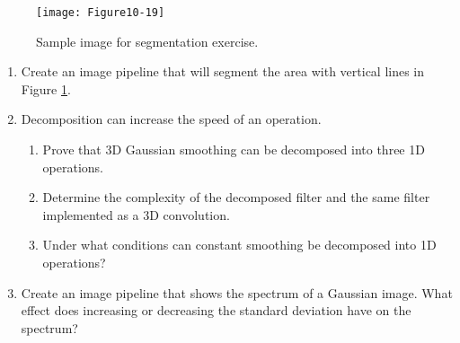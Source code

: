 \begin{figure}[!htb]
	\centering
	\texttt{[image: Figure10-19]}
	\caption{Sample image for segmentation exercise.}
	\label{fig:Figure10-19}
\end{figure}

\begin{enumerate}

\item Create an image pipeline that will segment the area with vertical lines in Figure \ref{fig:Figure10-19}.

\item Decomposition can increase the speed of an operation.

    \begin{enumerate}

    \item Prove that 3D Gaussian smoothing can be decomposed into three 1D operations.

    \item Determine the complexity of the decomposed filter and the same filter implemented as a 3D convolution.

    \item Under what conditions can constant smoothing be decomposed into 1D operations?

    \end{enumerate}

\item Create an image pipeline that shows the spectrum of a Gaussian image. What effect does increasing or decreasing the standard deviation have on the spectrum?

\end{enumerate}
